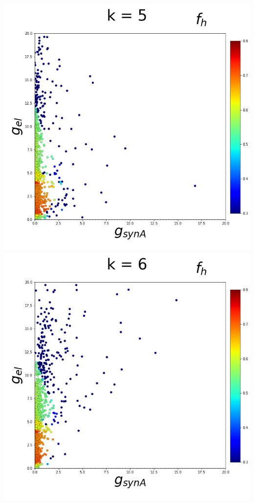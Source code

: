\documentclass[11pt]{article}
\begin{document}
\begin{center}
\includegraphics[scale=0.125]{DSN_figs/STGCircuit_DSN_c=0_rs=4_k=5.png}
\includegraphics[scale=0.125]{DSN_figs/STGCircuit_DSN_c=0_rs=4_k=6.png}

\end{center}
\end{document}
